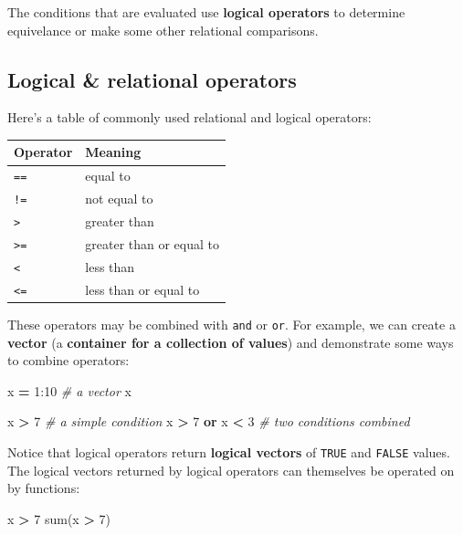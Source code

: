 \documentclass[]{book}
\newenvironment{Shaded}{\begin{snugshade}}{\end{snugshade}}
\newcommand{\KeywordTok}[1]{\textcolor[rgb]{0.13,0.29,0.53}{\textbf{#1}}}
\newcommand{\DecValTok}[1]{\textcolor[rgb]{0.00,0.00,0.81}{#1}}
\newcommand{\CommentTok}[1]{\textcolor[rgb]{0.56,0.35,0.01}{\textit{#1}}}
\newcommand{\OperatorTok}[1]{\textcolor[rgb]{0.81,0.36,0.00}{\textbf{#1}}}
\newcommand{\BuiltInTok}[1]{#1}
\newcommand{\NormalTok}[1]{#1}
\begin{document}
The conditions that are evaluated use \textbf{logical operators} to
determine equivelance or make some other relational comparisons.

\subsection{Logical \& relational
operators}\label{logical-relational-operators}

Here's a table of commonly used relational and logical operators:

\begin{longtable}[]{@{}ll@{}}
\toprule
Operator & Meaning\tabularnewline
\midrule
\endhead
\texttt{==} & equal to\tabularnewline
\texttt{!=} & not equal to\tabularnewline
\texttt{\textgreater{}} & greater than\tabularnewline
\texttt{\textgreater{}=} & greater than or equal to\tabularnewline
\texttt{\textless{}} & less than\tabularnewline
\texttt{\textless{}=} & less than or equal to\tabularnewline
\bottomrule
\end{longtable}

These operators may be combined with \texttt{and} or \texttt{or}. For
example, we can create a \textbf{vector} (a \textbf{container for a
collection of values}) and demonstrate some ways to combine operators:

\begin{Shaded}
\begin{Highlighting}[]
\NormalTok{x }\OperatorTok{=} \DecValTok{1}\NormalTok{:}\DecValTok{10} \CommentTok{# a vector}
\NormalTok{x}

\NormalTok{x }\OperatorTok{>} \DecValTok{7} \CommentTok{# a simple condition}
\NormalTok{x }\OperatorTok{>} \DecValTok{7} \KeywordTok{or}\NormalTok{ x }\OperatorTok{<} \DecValTok{3} \CommentTok{# two conditions combined}
\end{Highlighting}
\end{Shaded}

Notice that logical operators return \textbf{logical vectors} of
\texttt{TRUE} and \texttt{FALSE} values. The logical vectors returned by
logical operators can themselves be operated on by functions:

\begin{Shaded}
\begin{Highlighting}[]
\NormalTok{x }\OperatorTok{>} \DecValTok{7}
\BuiltInTok{sum}\NormalTok{(x }\OperatorTok{>} \DecValTok{7}\NormalTok{)}
\end{Highlighting}
\end{Shaded}
\end{document}
